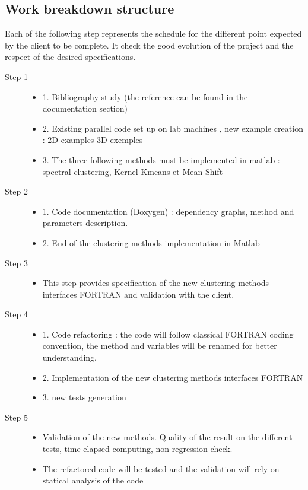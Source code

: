 \documentclass[12pt]{article} %
\begin{document}
\subsection{Work breakdown structure}
Each of the following step represents the schedule for the different point expected by the client to be complete. It check the good evolution of the project and the respect of the desired specifications.
\begin{description}
\item[Step 1]
	\begin{itemize}
	\item 1. Bibliography study (the reference can be found in the documentation section)
 	\item 2. Existing parallel code set up on lab machines , new example creation : 2D examples 3D exemples
	\item 3. The three following methods must be implemented in matlab : spectral clustering, Kernel K­means et Mean Shift        
	\end{itemize} 
\item[Step 2]
	\begin{itemize}
	\item 1. Code documentation (Doxygen) : dependency graphs, method and parameters description.
	\item 2. End of the clustering methods implementation in Matlab
	\end{itemize}
\item[Step 3]
	\begin{itemize}
	\item This step provides specification of the new clustering methods interfaces FORTRAN and validation with the client.
	\end{itemize}
\item[Step 4]
	\begin{itemize}
	\item 1. Code refactoring : the code will follow classical FORTRAN coding convention, the method and variables will be renamed for better understanding.
	\item 2. Implementation of the new clustering methods interfaces FORTRAN
	\item 3. new tests generation
	\end{itemize}
\item[Step 5]
	\begin{itemize}
	\item Validation of the new methods. Quality of the result on the different tests, time elapsed computing, non regression check.
	\item The refactored code will be tested and the validation will rely on statical analysis of the code
	\end{itemize}
\end{description}
\end{document}
